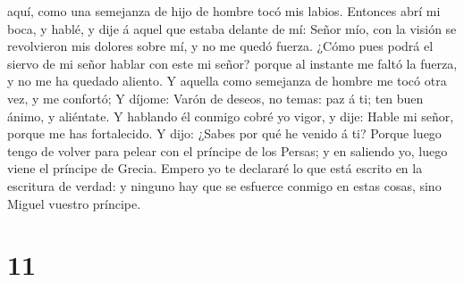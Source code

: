 aquí, como una semejanza de hijo de hombre tocó mis labios. Entonces
abrí mi boca, y hablé, y dije á aquel que estaba delante de mí: Señor
mío, con la visión se revolvieron mis dolores sobre mí, y no me quedó
fuerza.  ¿Cómo pues podrá el siervo de mi señor hablar con
este mi señor? porque al instante me faltó la fuerza, y no me ha quedado
aliento.  Y aquella como semejanza de hombre me tocó otra
vez, y me confortó;  Y díjome: Varón de deseos, no temas:
paz á ti; ten buen ánimo, y aliéntate. Y hablando él conmigo cobré yo
vigor, y dije: Hable mi señor, porque me has fortalecido. 
Y dijo: ¿Sabes por qué he venido á ti? Porque luego tengo de volver para
pelear con el príncipe de los Persas; y en saliendo yo, luego viene el
príncipe de Grecia.  Empero yo te declararé lo que está
escrito en la escritura de verdad: y ninguno hay que se esfuerce conmigo
en estas cosas, sino Miguel vuestro príncipe.

\hypertarget{section-10}{%
\section{11}\label{section-10}}

